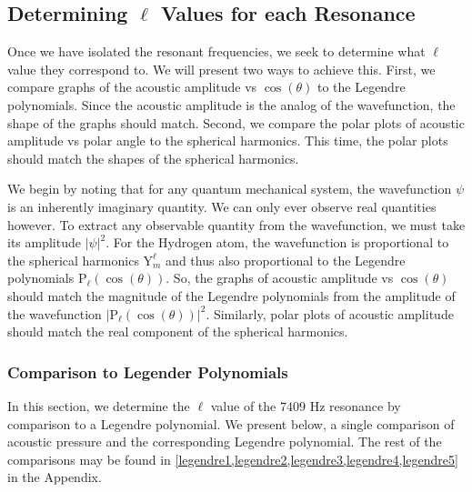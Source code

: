 \documentclass[12pt]{article}
\newcommand{\Ylm}[2]{\mathrm{Y}^{#1}_{#2}} %
\begin{document}
	
		
	
	\subsection{Determining $\ell$ Values for each Resonance}
	Once we have isolated the resonant frequencies, we seek to determine what $\ell$ value they correspond to. We will present two ways to achieve this. First, we compare graphs of the acoustic amplitude vs $\cos(\theta)$ to the Legendre polynomials. Since the acoustic amplitude is the analog of the wavefunction, the shape of the graphs should match. Second, we compare the polar plots of acoustic amplitude vs polar angle to the spherical harmonics. This time, the polar plots should match the shapes of the spherical harmonics.
	
	We begin by noting that for any quantum mechanical system, the wavefunction $\psi$ is an inherently imaginary quantity. We can only ever observe real quantities however. To extract any observable quantity from the wavefunction, we must take its amplitude $|\psi|^2$. For the Hydrogen atom, the wavefunction is proportional to the spherical harmonics $\Ylm{\ell}{m}$ and thus also proportional to the Legendre polynomials $\mathrm{P}_\ell(\cos(\theta))$. So, the graphs of acoustic amplitude vs $\cos(\theta)$ should match the magnitude of the Legendre polynomials from the amplitude of the wavefunction $|\mathrm{P}_\ell(\cos(\theta))|^2$. Similarly, polar plots of acoustic amplitude should match the real component of the spherical harmonics.
	

	\subsubsection{Comparison to Legender Polynomials}
	In this section, we determine the $\ell$ value of the $7409$ Hz resonance by comparison to a Legendre polynomial. We present below, a single comparison of acoustic pressure and the corresponding Legendre polynomial. The rest of the comparisons may be found in \cref{legendre1,legendre2,legendre3,legendre4,legendre5} in the Appendix.
	
\end{document}
